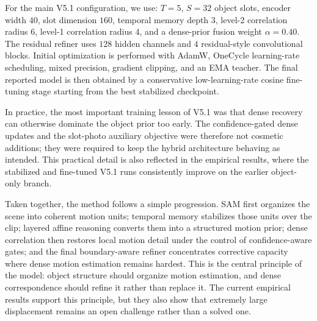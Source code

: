 For the main V5.1 configuration, we use: $T=5$, $S=32$ object slots, encoder width $40$, slot dimension $160$, temporal memory depth $3$, level-2 correlation radius $6$, level-1 correlation radius $4$, and a dense-prior fusion weight $\alpha=0.40$. The residual refiner uses $128$ hidden channels and $4$ residual-style convolutional blocks. Initial optimization is performed with AdamW, OneCycle learning-rate scheduling, mixed precision, gradient clipping, and an EMA teacher. The final reported model is then obtained by a conservative low-learning-rate cosine fine-tuning stage starting from the best stabilized checkpoint.

In practice, the most important training lesson of V5.1 was that dense recovery can otherwise dominate the object prior too early. The confidence-gated dense updates and the slot-photo auxiliary objective were therefore not cosmetic additions; they were required to keep the hybrid architecture behaving as intended. This practical detail is also reflected in the empirical results, where the stabilized and fine-tuned V5.1 runs consistently improve on the earlier object-only branch.

Taken together, the method follows a simple progression. SAM first organizes the scene into coherent motion units; temporal memory stabilizes those units over the clip; layered affine reasoning converts them into a structured motion prior; dense correlation then restores local motion detail under the control of confidence-aware gates; and the final boundary-aware refiner concentrates corrective capacity where dense motion estimation remains hardest. This is the central principle of the model: object structure should organize motion estimation, and dense correspondence should refine it rather than replace it. The current empirical results support this principle, but they also show that extremely large displacement remains an open challenge rather than a solved one.
